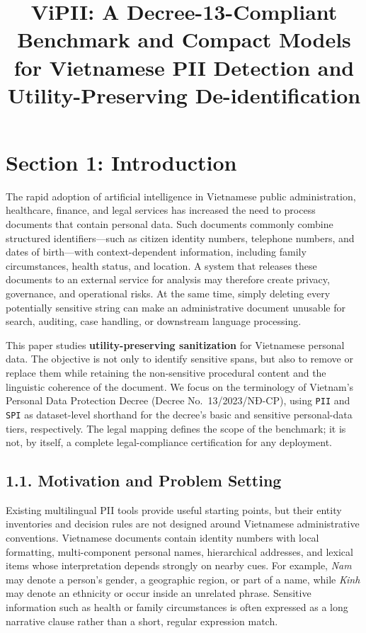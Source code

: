 \documentclass[
]{article}
\title{ViPII: A Decree-13-Compliant Benchmark and Compact Models for
Vietnamese PII Detection and Utility-Preserving De-identification}
\author{}
\date{}
\begin{document}
\maketitle

\section{Section 1: Introduction}\label{section-1-introduction}

The rapid adoption of artificial intelligence in Vietnamese public
administration, healthcare, finance, and legal services has increased
the need to process documents that contain personal data. Such documents
commonly combine structured identifiers---such as citizen identity
numbers, telephone numbers, and dates of birth---with context-dependent
information, including family circumstances, health status, and
location. A system that releases these documents to an external service
for analysis may therefore create privacy, governance, and operational
risks. At the same time, simply deleting every potentially sensitive
string can make an administrative document unusable for search,
auditing, case handling, or downstream language processing.

This paper studies \textbf{utility-preserving sanitization} for
Vietnamese personal data. The objective is not only to identify
sensitive spans, but also to remove or replace them while retaining the
non-sensitive procedural content and the linguistic coherence of the
document. We focus on the terminology of Vietnam's Personal Data
Protection Decree (Decree No.~13/2023/NĐ-CP), using \texttt{PII} and
\texttt{SPI} as dataset-level shorthand for the decree's basic and
sensitive personal-data tiers, respectively. The legal mapping defines
the scope of the benchmark; it is not, by itself, a complete
legal-compliance certification for any deployment.

\subsection{1.1. Motivation and Problem
Setting}\label{motivation-and-problem-setting}

Existing multilingual PII tools provide useful starting points, but
their entity inventories and decision rules are not designed around
Vietnamese administrative conventions. Vietnamese documents contain
identity numbers with local formatting, multi-component personal names,
hierarchical addresses, and lexical items whose interpretation depends
strongly on nearby cues. For example, \emph{Nam} may denote a person's
gender, a geographic region, or part of a name, while \emph{Kinh} may
denote an ethnicity or occur inside an unrelated phrase. Sensitive
information such as health or family circumstances is often expressed as
a long narrative clause rather than a short, regular expression match.
\end{document}

